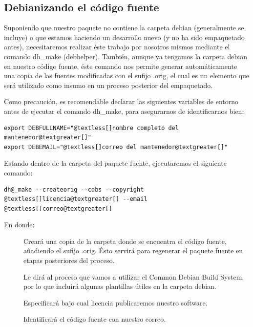 \documentclass[letterpaper,12pt,spanish]{manual}
\begin{document}
\subsection{Debianizando el código fuente}

Suponiendo que nuestro paquete no contiene la carpeta debian (generalmente se incluye) o que estamos haciendo un desarrollo nuevo (y no ha sido empaquetado antes), necesitaremos realizar éste trabajo por nosotros mismos mediante el comando dh\_make (debhelper). También, aunque ya tengamos la carpeta debian en nuestro código fuente, éste comando nos permite generar automáticamente una copia de las fuentes modificadas con el sufijo .orig, el cual es un elemento que será utilizado como insumo en un proceso posterior del empaquetado.

Como precaución, es recomendable declarar las siguientes variables de entorno antes de ejecutar el comando dh\_make, para asegurarnos de identificarnos bien:

\begin{Verbatim}[commandchars=@\[\]]
export DEBFULLNAME="@textless[]nombre completo del mantenedor@textgreater[]"
export DEBEMAIL="@textless[]correo del mantenedor@textgreater[]"
\end{Verbatim}

Estando dentro de la carpeta del paquete fuente, ejecutaremos el siguiente comando:

\begin{Verbatim}[commandchars=@\[\]]
dh@_make --createorig --cdbs --copyright @textless[]licencia@textgreater[] --email @textless[]correo@textgreater[]
\end{Verbatim}

En donde:
\begin{description}
\item[{}] \leavevmode
Creará una copia de la carpeta donde se encuentra el código fuente, añadiendo el sufijo .orig. Ésto servirá para regenerar el paquete fuente en etapas posteriores del proceso.

\item[{}] \leavevmode
Le dirá al proceso que vamos a utilizar el Common Debian Build System, por lo que incluirá algunas plantillas útiles en la carpeta debian.

\item[{}] \leavevmode
Especificará bajo cual licencia publicaremos nuestro software.

\item[{}] \leavevmode
Identificará el código fuente con nuestro correo.

\end{description}
\end{document}
